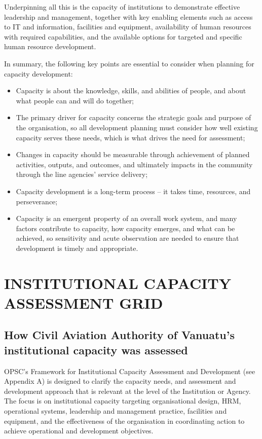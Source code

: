 \documentclass[
  10pt,
]{report}
\providecommand{\tightlist}{%
  \setlength{\itemsep}{0pt}\setlength{\parskip}{0pt}}
\begin{document}
Underpinning all this is the capacity of institutions to demonstrate
effective leadership and management, together with key enabling elements
such as access to IT and information, facilities and equipment,
availability of human resources with required capabilities, and the
available options for targeted and specific human resource development.

In summary, the following key points are essential to consider when
planning for capacity development:

\begin{itemize}
\tightlist
\item
  Capacity is about the knowledge, skills, and abilities of people, and
  about what people can and will do together;
\item
  The primary driver for capacity concerns the strategic goals and
  purpose of the organisation, so all development planning must consider
  how well existing capacity serves these needs, which is what drives
  the need for assessment;
\item
  Changes in capacity should be measurable through achievement of
  planned activities, outputs, and outcomes, and ultimately impacts in
  the community through the line agencies' service delivery;
\item
  Capacity development is a long-term process -- it takes time,
  resources, and perseverance;
\item
  Capacity is an emergent property of an overall work system, and many
  factors contribute to capacity, how capacity emerges, and what can be
  achieved, so sensitivity and acute observation are needed to ensure
  that development is timely and appropriate.
\end{itemize}

\chapter{INSTITUTIONAL CAPACITY ASSESSMENT
GRID}\label{institutional-capacity-assessment-grid}

\section{How Civil Aviation Authority of Vanuatu's institutional
capacity was
assessed}\label{how-civil-aviation-authority-of-vanuatus-institutional-capacity-was-assessed}

OPSC's Framework for Institutional Capacity Assessment and Development
(see Appendix A) is designed to clarify the capacity needs, and
assessment and development approach that is relevant at the level of the
Institution or Agency. The focus is on institutional capacity targeting
organisational design, HRM, operational systems, leadership and
management practice, facilities and equipment, and the effectiveness of
the organisation in coordinating action to achieve operational and
development objectives.
\end{document}
